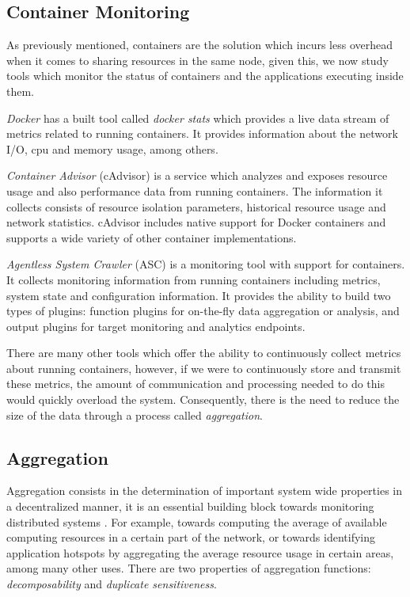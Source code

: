 \subsection{Container Monitoring}

As previously mentioned, containers are the solution which incurs less overhead when it comes to sharing resources in the same node, given this, we now study tools which monitor the status of containers and the applications executing inside them. 

\textit{Docker} \cite{docker} has a built tool called \textit{docker stats} \cite{docker_stats} which provides a live data stream of metrics related to running containers. It provides information about the network I/O, cpu and memory usage, among others. 

\textit{Container Advisor} \cite{cAdvisor} (cAdvisor) is a service which analyzes and exposes resource usage and also performance data from running containers. The information it collects consists of resource isolation parameters, historical resource usage and network statistics. cAdvisor includes native support for Docker containers and supports a wide variety of other container implementations.

\textit{Agentless System Crawler}  (ASC) \cite{cloudviz_2019} is a monitoring tool with support for containers. It collects monitoring information from running containers including metrics, system state and configuration information. It provides the ability to build two types of plugins: function  plugins for on-the-fly data aggregation or analysis, and output plugins for target monitoring and analytics endpoints.

There are many other tools which offer the ability to continuously collect metrics about running containers, however, if we were to continuously store and transmit these metrics, the amount of communication and processing needed to do this would quickly overload the system. Consequently, there is the need to reduce the size of the data through a process called \textit{aggregation}.

\subsection{Aggregation}

Aggregation consists in the determination of important system wide properties in a decentralized manner, it is an essential building block towards monitoring distributed systems \cite{8613952} \cite{DBLP:journals/corr/abs-1110-0725}. For example, towards computing the average of available computing resources in a certain part of the network, or towards identifying application hotspots by aggregating the average resource usage in certain areas, among many other uses. There are two properties of aggregation functions: \textit{decomposability} and \textit{duplicate sensitiveness}.

